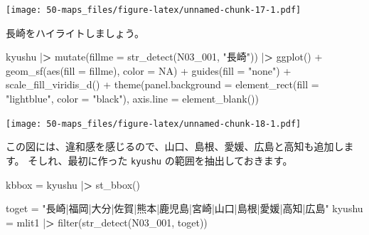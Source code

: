 \documentclass[
]{book}
\newenvironment{Shaded}{\begin{snugshade}}{\end{snugshade}}
\newcommand{\AttributeTok}[1]{\textcolor[rgb]{0.77,0.63,0.00}{#1}}
\newcommand{\ConstantTok}[1]{\textcolor[rgb]{0.00,0.00,0.00}{#1}}
\newcommand{\ErrorTok}[1]{\textcolor[rgb]{0.64,0.00,0.00}{\textbf{#1}}}
\newcommand{\FunctionTok}[1]{\textcolor[rgb]{0.00,0.00,0.00}{#1}}
\newcommand{\NormalTok}[1]{#1}
\newcommand{\OtherTok}[1]{\textcolor[rgb]{0.56,0.35,0.01}{#1}}
\newcommand{\SpecialCharTok}[1]{\textcolor[rgb]{0.00,0.00,0.00}{#1}}
\newcommand{\StringTok}[1]{\textcolor[rgb]{0.31,0.60,0.02}{#1}}
\theoremstyle{definition}
\theoremstyle{definition}
\theoremstyle{definition}
\theoremstyle{definition}
\theoremstyle{remark}
\begin{document}
\texttt{[image: 50-maps\_files/figure-latex/unnamed-chunk-17-1.pdf]}

長崎をハイライトしましょう。

\begin{Shaded}
\begin{Highlighting}[]
\NormalTok{kyushu }\SpecialCharTok{|}\ErrorTok{\textgreater{}} 
  \FunctionTok{mutate}\NormalTok{(}\AttributeTok{fillme =} \FunctionTok{str\_detect}\NormalTok{(N03\_001, }\StringTok{"長崎"}\NormalTok{)) }\SpecialCharTok{|}\ErrorTok{\textgreater{}} 
  \FunctionTok{ggplot}\NormalTok{() }\SpecialCharTok{+} \FunctionTok{geom\_sf}\NormalTok{(}\FunctionTok{aes}\NormalTok{(}\AttributeTok{fill =}\NormalTok{ fillme), }\AttributeTok{color =} \ConstantTok{NA}\NormalTok{) }\SpecialCharTok{+}
  \FunctionTok{guides}\NormalTok{(}\AttributeTok{fill =} \StringTok{"none"}\NormalTok{) }\SpecialCharTok{+}
  \FunctionTok{scale\_fill\_viridis\_d}\NormalTok{() }\SpecialCharTok{+}
  \FunctionTok{theme}\NormalTok{(}\AttributeTok{panel.background =} \FunctionTok{element\_rect}\NormalTok{(}\AttributeTok{fill =} \StringTok{"lightblue"}\NormalTok{, }\AttributeTok{color =} \StringTok{"black"}\NormalTok{),}
        \AttributeTok{axis.line =} \FunctionTok{element\_blank}\NormalTok{())}
\end{Highlighting}
\end{Shaded}

\texttt{[image: 50-maps\_files/figure-latex/unnamed-chunk-18-1.pdf]}

この図には、違和感を感じるので、山口、島根、愛媛、広島と高知も追加します。
そしれ、最初に作った \texttt{kyushu} の範囲を抽出しておきます。

\begin{Shaded}
\begin{Highlighting}[]
\NormalTok{kbbox }\OtherTok{=}\NormalTok{ kyushu }\SpecialCharTok{|}\ErrorTok{\textgreater{}} \FunctionTok{st\_bbox}\NormalTok{()}
\end{Highlighting}
\end{Shaded}

\begin{Shaded}
\begin{Highlighting}[]
\NormalTok{toget }\OtherTok{=} \StringTok{"長崎|福岡|大分|佐賀|熊本|鹿児島|宮崎|山口|島根|愛媛|高知|広島"}
\NormalTok{kyushu }\OtherTok{=}\NormalTok{ mlit1 }\SpecialCharTok{|}\ErrorTok{\textgreater{}} \FunctionTok{filter}\NormalTok{(}\FunctionTok{str\_detect}\NormalTok{(N03\_001, toget))}
\end{Highlighting}
\end{Shaded}
\end{document}
